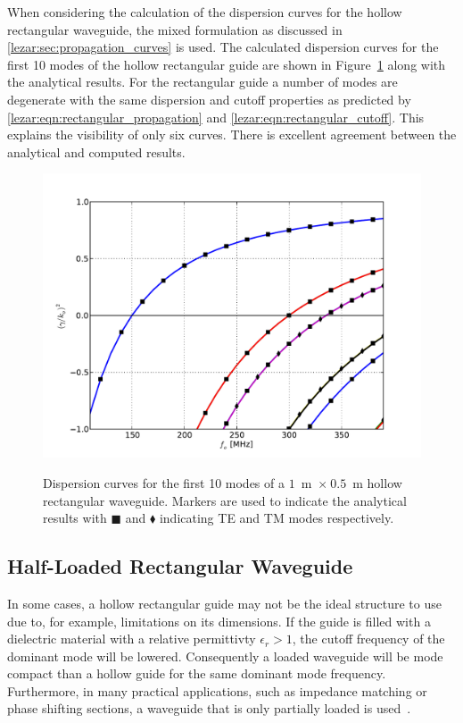 When considering the calculation of the dispersion curves for the
hollow rectangular waveguide, the mixed formulation as discussed in
\ref{lezar:sec:propagation_curves} is used.  The calculated dispersion
curves for the first 10 modes of the hollow rectangular guide are
shown in Figure~\ref{lezar:fig:hollow_rectangular_dispersion_curves} along
with the analytical results. For the rectangular guide a number of
modes are degenerate with the same dispersion and cutoff properties as
predicted by \eqref{lezar:eqn:rectangular_propagation} and
\eqref{lezar:eqn:rectangular_cutoff}. This explains the visibility of only
six curves. There is excellent agreement between the analytical and
computed results.
\begin{figure}[h]
  \centering
  \includegraphics[width=\largefig]{chapters/lezar/pdf/hollow_dispersion_curve.pdf}
  \caption{Dispersion curves for the first 10 modes of a
    $1$~m~$\times~0.5$~m hollow rectangular waveguide. Markers are
    used to indicate the analytical results with $\blacksquare$ and
    $\blacklozenge$ indicating TE and TM modes respectively.}
  \label{lezar:fig:hollow_rectangular_dispersion_curves}
\end{figure}
\subsection{Half-Loaded Rectangular Waveguide}
In some cases, a hollow rectangular guide may not be the ideal
structure to use due to, for example, limitations on its
dimensions. If the guide is filled with a dielectric material with a
relative permittivty $\epsilon_r > 1$, the cutoff frequency of the dominant
mode will be lowered. Consequently a loaded waveguide will be mode
compact than a hollow guide for the same dominant mode
frequency. Furthermore, in many practical applications, such as
impedance matching or phase shifting sections, a waveguide that is
only partially loaded is used~\cite{Pozar2005}.

